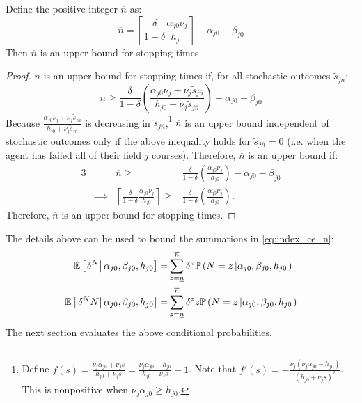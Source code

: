 \documentclass[11 pt]{article}
\newcommand{\pr}[1]{\left( #1 \right)}
\newcommand{\ce}[2]{\left[\left. #1 \right\vert #2 \right]}
\newcommand{\crs}[2]{#1 \left\vert #2 \right.}
\newcommand{\ceil}[1]{\left\lceil #1 \right\rceil}
\newcommand{\pass}{s}
\newcommand*{\ks}[1][t]{\tilde{\pass}_{j #1}}
\begin{document}
\begin{lemma}
Define the positive integer $\overline{n}$ as:
\begin{equation}\label{eq:upper_n}
    \overline{n} = \ceil{\frac{\delta}{1 - \delta} \frac{\alpha_{j0} \nu_j}{h_{j0}}} - \alpha_{j0} - \beta_{j0}
\end{equation}
Then $\overline{n}$ is an upper bound for stopping times.
\end{lemma}

\begin{proof}

$\overline{n}$ is an upper bound for stopping times if, for all stochastic outcomes $\ks[\overline{n}]$:
\begin{equation*}
    \overline{n} \geq 
    \frac{\delta}{1 - \delta} 
    \pr{\frac{\alpha_{j0} \nu_j + \nu_j \ks[\overline{n}]}{h_{j0} + \nu_j \ks[\overline{n}]}} - \alpha_{j0} - \beta_{j0}
\end{equation*}
Because $\frac{\alpha_{j0} \nu_j + \nu_j \ks[\overline{n}]}{h_{j0} + \nu_j \ks[\overline{n}]}$ is decreasing in $\ks[\overline{n}]$,\footnote{
    Define $f(s) = \frac{\nu_j \alpha_{j0} + \nu_j s}{h_{j0} + \nu_j s} = \frac{\nu_j\alpha_{j0} - h_{j0}}{h_{j0} + \nu_j s} + 1$. 
    Note that $f'(s) = -\frac{\nu_j (\nu_j \alpha_{j0} - h_{j0})}{\pr{h_{j0} + \nu_j s}^2}$.
    This is nonpositive when $\nu_j \alpha_{j0} \geq h_{j0}$. 
}
$\overline{n}$ is an upper bound independent of stochastic outcomes only if the above inequality holds for $\ks[\overline{n}] = 0$ (i.e. when the agent has failed all of their field $j$ courses).
Therefore, $\overline{n}$ is an upper bound if:
\begin{alignat*}{3}
    &&
    \overline{n} 
    \geq& 
    \frac{\delta}{1 - \delta} 
    \pr{\frac{\alpha_{j0} \nu_j}{h_{j0}}} 
    - \alpha_{j0} - \beta_{j0}
    \\
    &\implies&
    \ceil{\frac{\delta}{1 - \delta} \frac{\alpha_{j0} \nu_j}{h_{j0}}}
    \geq&
     \frac{\delta}{1 - \delta} 
    \pr{\frac{\alpha_{j0} \nu_j}{h_{j0}}}.
\end{alignat*}
Therefore, $\overline{n}$ is an upper bound for stopping times.
\end{proof}








The details above can be used to bound the summations in \eqref{eq:index_ce_n}:
\begin{align*}
    \EE \ce{\delta^N}{\alpha_{j0}, \beta_{j0}, h_{j0}} 
    =&
    \sum_{z=\underline{n}}^{\overline{n}} 
    \delta^z
    \PP
    \pr{\crs{
        N = z
    }{\alpha_{j0}, \beta_{j0}, h_{j0}}}
    \\
    \EE \ce{\delta^N N}{\alpha_{j0}, \beta_{j0}, h_{j0}} 
    =&
    \sum_{z=\underline{n}}^{\overline{n}} 
    \delta^z z
    \PP
    \pr{\crs{
        N = z
    }{\alpha_{j0}, \beta_{j0}, h_{j0}}}
\end{align*}
The next section evaluates the above conditional probabilities.
\end{document}
